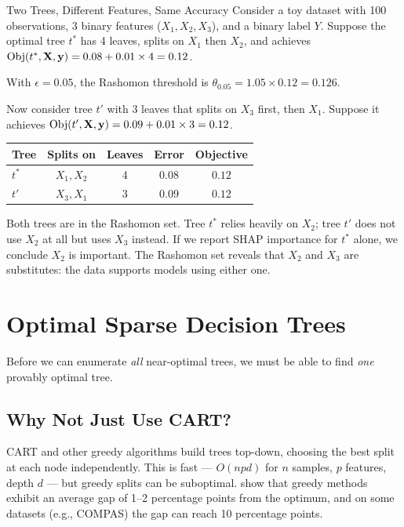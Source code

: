 \begin{workedexample}{Two Trees, Different Features, Same Accuracy}
Consider a toy dataset with 100 observations, 3 binary features
($X_1, X_2, X_3$), and a binary label $Y$.  Suppose the optimal tree $t^*$
has 4 leaves, splits on $X_1$ then $X_2$, and achieves
$\operatorname{Obj}(t^*, \mathbf{X}, \mathbf{y}) = 0.08 + 0.01 \times 4 = 0.12$.

With $\epsilon = 0.05$, the Rashomon threshold is $\theta_{0.05} = 1.05
\times 0.12 = 0.126$.

Now consider tree $t'$ with 3 leaves that splits on $X_3$ first, then $X_1$.
Suppose it achieves $\operatorname{Obj}(t', \mathbf{X}, \mathbf{y}) = 0.09 + 0.01 \times 3
= 0.12$.

\begin{center}
\begin{tabular}{lcccc}
\toprule
Tree & Splits on & Leaves & Error & Objective \\
\midrule
$t^*$ & $X_1, X_2$ & 4 & $0.08$ & $0.12$ \\
$t'$ & $X_3, X_1$ & 3 & $0.09$ & $0.12$ \\
\bottomrule
\end{tabular}
\end{center}

Both trees are in the Rashomon set.  Tree $t^*$ relies heavily on $X_2$;
tree $t'$ does not use $X_2$ at all but uses $X_3$ instead.  If we report
SHAP importance for $t^*$ alone, we conclude $X_2$ is important.  The
Rashomon set reveals that $X_2$ and $X_3$ are substitutes: the data supports
models using either one.
\end{workedexample}


\section{Optimal Sparse Decision Trees}\label{sec:rashomon:optimal-trees}

Before we can enumerate \emph{all} near-optimal trees, we must be able to
find \emph{one} provably optimal tree.

\subsection{Why Not Just Use CART?}

CART \citep{Breiman1984} and other greedy algorithms build trees top-down,
choosing the best split at each node independently.  This is fast ---
$O(npd)$ for $n$ samples, $p$ features, depth $d$ --- but greedy splits can
be suboptimal.  \citet{BabbarEtAl2025} show that greedy methods exhibit
an average gap of 1--2 percentage points from the optimum, and on some
datasets (e.g., COMPAS) the gap can reach 10 percentage points.

